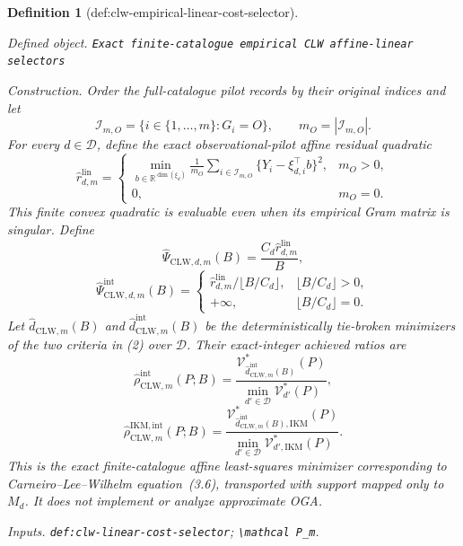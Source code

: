 \documentclass{article}
\newtheorem{definition}{Definition}
\begin{document}
\begin{definition}[def:clw-empirical-linear-cost-selector]\label{def:clw-empirical-linear-cost-selector}
\par\smallskip\noindent\emph{Defined object.} \texttt{Exact finite-\allowbreak{}catalogue empirical CLW affine-\allowbreak{}linear selectors}
\par\smallskip\noindent\emph{Construction.} Order the full-catalogue pilot records by their original indices and let
\[
 \mathcal I_{m,O}=\{i\in\{1,\ldots,m\}:G_i=O\},
 \qquad m_O=|\mathcal I_{m,O}|.
\]
For every \(d\in\mathcal D\), define the exact observational-pilot affine residual quadratic
\[
 \widehat r_{d,m}^{\mathrm{lin}}=
 \begin{cases}
 \displaystyle
 \min_{b\in\mathbb R^{\dim(\xi_d)}}
 \frac1{m_O}\sum_{i\in\mathcal I_{m,O}}
 \{Y_i-\xi_{d,i}^\top b\}^2,&m_O>0,\\[6pt]
 0,&m_O=0.
 \end{cases}                                                \tag{1}
\]
This finite convex quadratic is evaluable even when its empirical Gram matrix is singular.  Define
\[
 \widehat\Psi_{\mathrm{CLW},d,m}(B)
 =\frac{C_d\widehat r_{d,m}^{\mathrm{lin}}}{B},
\]
\[
 \widehat\Psi_{\mathrm{CLW},d,m}^{\mathrm{int}}(B)=
 \begin{cases}
 \widehat r_{d,m}^{\mathrm{lin}}/\lfloor B/C_d\rfloor,
 &\lfloor B/C_d\rfloor>0,\\
 +\infty,&\lfloor B/C_d\rfloor=0.
 \end{cases}                                                \tag{2}
\]
Let \(\widehat d_{\mathrm{CLW},m}(B)\) and
\(\widehat d_{\mathrm{CLW},m}^{\mathrm{int}}(B)\) be the deterministically tie-broken minimizers of the two criteria in (2) over \(\mathcal D\).  Their exact-integer achieved ratios are
\[
 \widehat\rho_{\mathrm{CLW},m}^{\mathrm{int}}(P;B)=
 \frac{\mathcal V_{\widehat d_{\mathrm{CLW},m}^{\mathrm{int}}(B)}^*(P)}
 {\min_{d'\in\mathcal D}\mathcal V_{d'}^*(P)},
\]
\[
 \widehat\rho_{\mathrm{CLW},m}^{\mathrm{IKM,int}}(P;B)=
 \frac{\mathcal V_{\widehat d_{\mathrm{CLW},m}^{\mathrm{int}}(B),\mathrm{IKM}}^*(P)}
 {\min_{d'\in\mathcal D}\mathcal V_{d',\mathrm{IKM}}^*(P)}. \tag{3}
\]
This is the exact finite-catalogue affine least-squares minimizer corresponding to Carneiro--Lee--Wilhelm equation~(3.6), transported with support mapped only to \(M_d\).  It does not implement or analyze approximate OGA.
\par\smallskip\noindent\emph{Inputs.} \texttt{def:\allowbreak{}clw-\allowbreak{}linear-\allowbreak{}cost-\allowbreak{}selector}; \texttt{\textbackslash{}\allowbreak{}mathcal P\_\allowbreak{}m}.
\end{definition}
\end{document}
